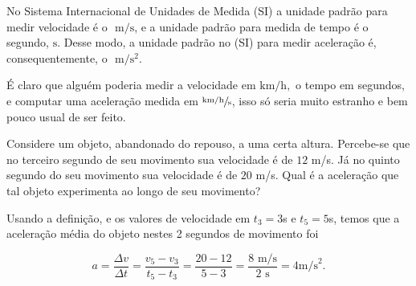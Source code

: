 
No Sistema Internacional de Unidades de Medida (SI) a unidade padrão para medir velocidade é o $\text{ m}/\text{s}$, e a unidade padrão para medida de tempo é o segundo, $\text{s}.$ Desse modo, a unidade padrão no (SI) para medir aceleração é, consequentemente, o $\text{ m}/\text{s}^2$.


É claro que alguém poderia medir a velocidade em $\text{km}/\text{h},$ o tempo em segundos, e computar uma aceleração medida em $\sfrac{\text{km/h}}{\text{s}}$, isso só seria muito estranho e bem pouco usual de ser feito.

\vspace{0.3cm}

\begin{exemplo}[Nível I]\label{exemplo_cinematicaescalar_aceleracaomedia01}


Considere um objeto, abandonado do repouso, a uma certa altura. Percebe-se que no terceiro segundo de seu movimento sua velocidade é de $12$ m/s. Já no quinto segundo do seu movimento sua velocidade é de $20$ m/s. Qual é a aceleração que tal objeto experimenta ao longo de seu movimento?



\resolucao



Usando a definição, e os valores de velocidade em $t_3=3$s e $t_5=5$s, temos que a aceleração média do objeto nestes 2 segundos de movimento foi

$$ a = \dfrac{\Delta v}{\Delta t} = \dfrac{v_5-v_3}{t_5-t_3}=\dfrac{20-12}{5-3} = \dfrac{8 \text{ m/s}}{2 \text{ s}} = 4 \text{m/s}^2.$$

  

    
\end{exemplo}

\vspace{0.3cm}




